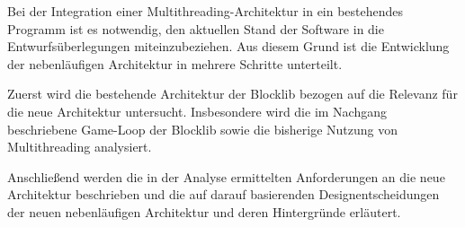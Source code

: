 Bei der Integration einer Multithreading-Architektur in ein bestehendes \gls{Programm} ist es notwendig, den aktuellen Stand der Software in die Entwurfsüberlegungen miteinzubeziehen. Aus diesem Grund ist die Entwicklung der nebenläufigen Architektur in mehrere Schritte unterteilt.

Zuerst wird die bestehende Architektur der Blocklib bezogen auf die Relevanz für die neue Architektur untersucht. Insbesondere wird die im Nachgang beschriebene Game-Loop der Blocklib sowie die bisherige Nutzung von Multithreading analysiert.

Anschließend werden die in der Analyse ermittelten Anforderungen an die neue Architektur beschrieben und die auf darauf basierenden Designentscheidungen der neuen nebenläufigen Architektur und deren Hintergründe erläutert.